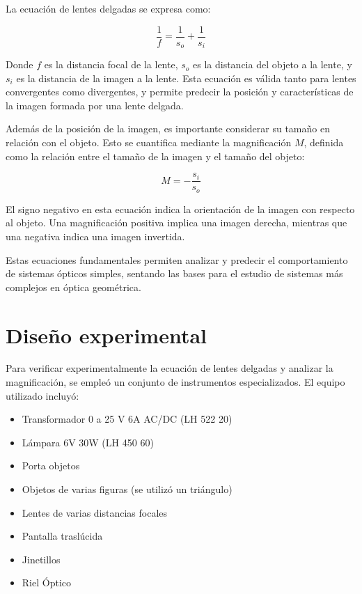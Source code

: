 \documentclass[twocolumn,a4paper,11pt]{scrartcl}
\begin{document}
La ecuación de lentes delgadas se expresa como:

\begin{equation}
\frac{1}{f} = \frac{1}{s_o} + \frac{1}{s_i}
\end{equation}

Donde $f$ es la distancia focal de la lente, $s_o$ es la distancia del objeto a la lente, y $s_i$ es la distancia de la imagen a la lente. Esta ecuación es válida tanto para lentes convergentes como divergentes, y permite predecir la posición y características de la imagen formada por una lente delgada.

Además de la posición de la imagen, es importante considerar su tamaño en relación con el objeto. Esto se cuantifica mediante la magnificación $M$, definida como la relación entre el tamaño de la imagen y el tamaño del objeto:

\begin{equation}
M = -\frac{s_i}{s_o}
\end{equation}

El signo negativo en esta ecuación indica la orientación de la imagen con respecto al objeto. Una magnificación positiva implica una imagen derecha, mientras que una negativa indica una imagen invertida.

Estas ecuaciones fundamentales permiten analizar y predecir el comportamiento de sistemas ópticos simples, sentando las bases para el estudio de sistemas más complejos en óptica geométrica.

\section{Diseño experimental}
Para verificar experimentalmente la ecuación de lentes delgadas y analizar la magnificación, se empleó un conjunto de instrumentos especializados. El equipo utilizado incluyó:

\begin{itemize}
    \item Transformador 0 a 25 V 6A AC/DC (LH 522 20)
    \item Lámpara 6V 30W (LH 450 60)
    \item Porta objetos
    \item Objetos de varias figuras (se utilizó un triángulo)
    \item Lentes de varias distancias focales
    \item Pantalla traslúcida
    \item Jinetillos
    \item Riel Óptico
\end{itemize}
\end{document}
